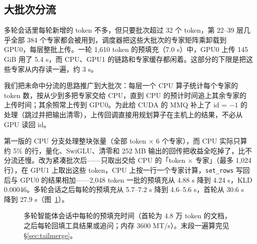 \documentclass[11pt,a4paper]{article}
\newcommand{\code}[1]{\texttt{#1}}
\begin{document}
\subsection{大批次分流}
\label{sec:bigsplit}

多轮会话里每轮新增的 token 不多，但只要批次超过 32 个 token，第 22--39 层几乎全部 384 个专家都会被用到，调度器把这些大批次的专家矩阵乘卸载到 GPU0，每层整批上传。一轮 1,610 token 的预填充（7.0 s）中，GPU0 上传 145 GiB 用了 5.4 s，而 CPU、GPU1 的链路和专家缓存都闲着。这部分的下限是把这些专家从内存读一遍，约 3 s。

我们把未命中分流的思路推广到大批次：每层一个 CPU 算子统计每个专家的 token 数，按从少到多把专家交给 CPU，直到 CPU 的预计时间追上其余专家的上传时间；其余照常上传到 GPU0。为此给 CUDA 的 MMQ 补上了 id = $-1$ 的处理（跳过并把输出清零），上传回调直接用规划算子在主机上的结果，不必从 GPU 读回 id。

第一版的 CPU 分支处理整块张量（全部 token × 6 个专家），而 CPU 实际只算约 5\% 的行，量化、SwiGLU、清零和 252 MB 输出的回传把收益全吃掉了，比不分流还慢。改为紧凑批次后——只取出交给 CPU 的「token × 专家」（最多 1,024 行），在 GPU1 上取出这些 token，CPU 上按一行一个专家计算，\code{set\_rows} 写回后与 GPU0 的结果相加——2,048 token 一批的预填充从 4.88 s 降到 4.24 s，KLD 0.00046。多轮会话之后每轮的预填充从 5.7--7.2 s 降到 4.6--5.6 s，首轮从 30.6 s 降到 27.9 s（图~\ref{fig:agent}）。

\begin{figure}[t]
  \centering
  \caption{多轮智能体会话中每轮的预填充时间（首轮为 4.8 万 token 的文档，之后每轮回填工具结果或追问；内存 3600 MT/s）。末段一遍算完见 \S\ref{sec:tailmerge}。}
  \label{fig:agent}
\end{figure}
\end{document}
